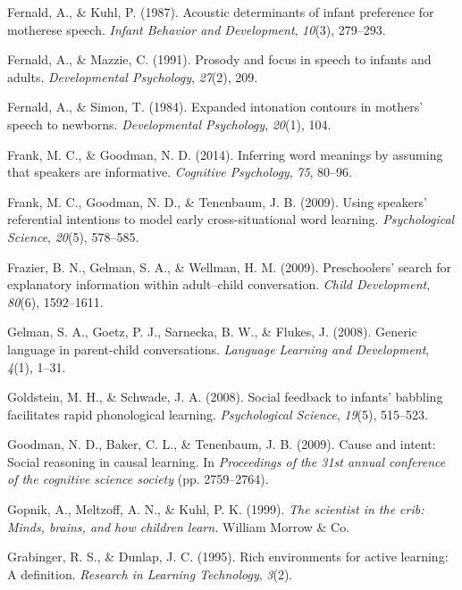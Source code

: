 \documentclass[a4paper,man,apacite,floatsintext]{apa6}
\begin{document}
\hypertarget{ref-fernald1987acoustic}{}
Fernald, A., \& Kuhl, P. (1987). Acoustic determinants of infant
preference for motherese speech. \emph{Infant Behavior and Development},
\emph{10}(3), 279--293.

\hypertarget{ref-fernald1991prosody}{}
Fernald, A., \& Mazzie, C. (1991). Prosody and focus in speech to
infants and adults. \emph{Developmental Psychology}, \emph{27}(2), 209.

\hypertarget{ref-fernald1984expanded}{}
Fernald, A., \& Simon, T. (1984). Expanded intonation contours in
mothers' speech to newborns. \emph{Developmental Psychology},
\emph{20}(1), 104.

\hypertarget{ref-frank2014inferring}{}
Frank, M. C., \& Goodman, N. D. (2014). Inferring word meanings by
assuming that speakers are informative. \emph{Cognitive Psychology},
\emph{75}, 80--96.

\hypertarget{ref-frank2009using}{}
Frank, M. C., Goodman, N. D., \& Tenenbaum, J. B. (2009). Using
speakers' referential intentions to model early cross-situational word
learning. \emph{Psychological Science}, \emph{20}(5), 578--585.

\hypertarget{ref-frazier2009preschoolers}{}
Frazier, B. N., Gelman, S. A., \& Wellman, H. M. (2009). Preschoolers'
search for explanatory information within adult--child conversation.
\emph{Child Development}, \emph{80}(6), 1592--1611.

\hypertarget{ref-gelman2008generic}{}
Gelman, S. A., Goetz, P. J., Sarnecka, B. W., \& Flukes, J. (2008).
Generic language in parent-child conversations. \emph{Language Learning
and Development}, \emph{4}(1), 1--31.

\hypertarget{ref-goldstein2008social}{}
Goldstein, M. H., \& Schwade, J. A. (2008). Social feedback to infants'
babbling facilitates rapid phonological learning. \emph{Psychological
Science}, \emph{19}(5), 515--523.

\hypertarget{ref-goodman2009cause}{}
Goodman, N. D., Baker, C. L., \& Tenenbaum, J. B. (2009). Cause and
intent: Social reasoning in causal learning. In \emph{Proceedings of the
31st annual conference of the cognitive science society} (pp.
2759--2764).

\hypertarget{ref-gopnik1999scientist}{}
Gopnik, A., Meltzoff, A. N., \& Kuhl, P. K. (1999). \emph{The scientist
in the crib: Minds, brains, and how children learn.} William Morrow \&
Co.

\hypertarget{ref-grabinger1995rich}{}
Grabinger, R. S., \& Dunlap, J. C. (1995). Rich environments for active
learning: A definition. \emph{Research in Learning Technology},
\emph{3}(2).
\end{document}
